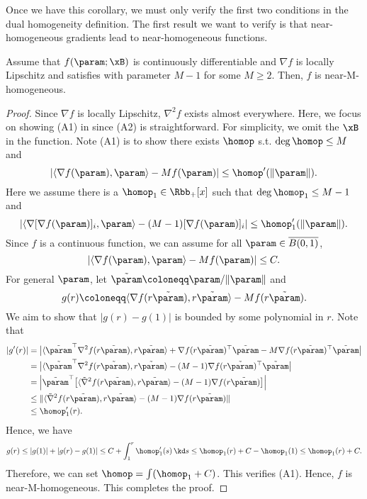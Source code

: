 Once we have this corollary, we must only verify the first two conditions in the dual homogeneity definition. The first result we want to verify is that near-homogeneous gradients lead to near-homogeneous functions. 

\begin{lemma}
\label{lem:near-homo gradients lead to near-homo functions}
Assume that $f(\param;\xB)$ is continuously differentiable and $\nabla f$ is locally Lipschitz and satisfies  with parameter $M-1$ for some $M\ge 2$. Then, $f$ is near-M-homogeneous.
\end{lemma}
\begin{proof}
Since $\nabla f$ is locally Lipschitz, $\nabla^2 f$ exists almost everywhere. Here, we focus on showing (A1) in  since (A2) is straightforward. For simplicity, we omit the $\xB$ in the function. Note (A1) is  to show there exists $\homop$ s.t. $\deg \homop \le M$ and 
\[
|\langle \nabla f(\param), \param \rangle - M f(\param) | \le \homop'(\|\param\|). 
\]
Here we assume there is a $\homop_1 \in \Rbb_+[x]$ such that $\deg \homop_1 \le M-1$ and 
\[
|\langle \nabla [\nabla f(\param)]_i, \param \rangle - (M-1) [\nabla f(\param)]_i | \le \homop_1'(\|\param\|). 
\]
Since $f$ is a continuous function, we can assume for all $\param \in \overline{B(0,1)}$, 
\[
|\langle \nabla f(\param), \param \rangle - M f(\param) | \le C. 
\]
For general $\param$, let $\tilde \param \coloneqq \param/ \|\param\|$ and  
\[
g(r) \coloneqq \langle \nabla f(r \tilde \param), r\tilde \param \rangle - M f(r \tilde \param). 
\]
We aim to show that $|g(r) - g(1)|$ is bounded by some polynomial in $r$.   Note that 
\begin{align*}
|g'(r)| 
&= \big|\langle \tilde \param^\top \nabla^2 f(r \tilde \param), r\tilde \param \rangle  +\nabla f(r \tilde \param) ^\top \tilde \param -  M \nabla f(r \tilde \param) ^\top \tilde \param \big | \\ 
&= \big|\langle \tilde \param^\top \nabla^2 f(r \tilde \param), r\tilde \param \rangle  -  (M-1) \nabla f(r \tilde \param) ^\top \tilde \param \big | \\ 
&= \Big |\tilde \param^\top \big[ \langle \tilde  \nabla^2 f(r \tilde \param), r\tilde \param \rangle  -  (M-1) \nabla f(r \tilde \param) \big] \Big | \\ 
&\le \| \langle \tilde  \nabla^2 f(r \tilde \param), r\tilde \param \rangle  -  (M-1) \nabla f(r \tilde \param) \|  \\ 
&\le \homop_1'(r). 
\end{align*}
Hence, we have 
\[
g(r) \le |g(1)| + |g(r) - g(1)| \le C + \int_1^r \homop_1'(s)\, \kd s \le \homop_1(r) + C - \homop_1(1)\le \homop_1(r) +C. 
\]
Therefore, we can set $\homop  = \int (\homop_1+C)$. This verifies (A1). Hence, $f$ is near-M-homogeneous. This completes the proof. 
\end{proof}

